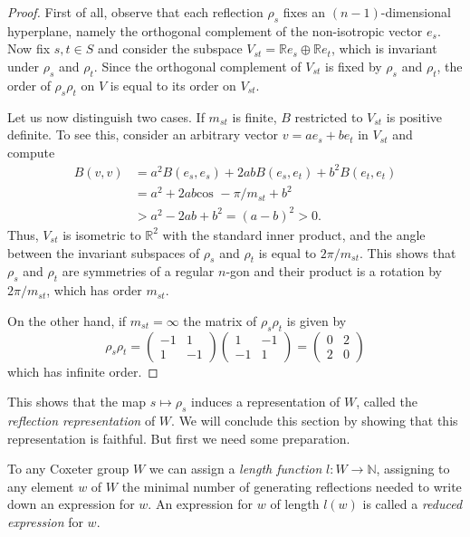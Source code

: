\documentclass{article}
\theoremstyle{definition}
\begin{document}
\begin{proof}
First of all, observe that each reflection $\rho_s$ fixes an $(n-1)$-dimensional hyperplane, namely the orthogonal complement of the non-isotropic vector $e_s$. Now fix $s,t\in S$ and consider the subspace $V_{st} = \mathbb{R}e_s \oplus \mathbb{R}e_t$, which is invariant under $\rho_s$ and $\rho_t$. Since the orthogonal complement of $V_{st}$ is fixed by $\rho_s$ and $\rho_t$, the order of $\rho_s\rho_t$ on $V$ is equal to its order on $V_{st}$.

Let us now distinguish two cases. If $m_{st}$ is finite, $B$ restricted to $V_{st}$ is positive definite. To see this, consider an arbitrary vector $v = ae_s + b e_t$ in $V_{st}$ and compute
\begin{align*}
B(v, v) & = a^2B(e_s, e_s) + 2abB(e_s, e_t) + b^2B(e_t, e_t)\\
& = a^2 + 2ab\text{cos } -\pi / m_{st} + b^2 \\
& > a^2 - 2ab + b^2 = (a - b)^2 > 0.
\end{align*}
Thus, $V_{st}$ is isometric to $\mathbb{R}^2$ with the standard inner product, and the angle between the invariant subspaces of $\rho_s$ and $\rho_t$ is equal to $2 \pi / m_{st}$. This shows that $\rho_s$ and $\rho_t$ are symmetries of a regular $n$-gon and their product is a rotation by $2\pi/m_{st}$, which has order $m_{st}$.

On the other hand, if $m_{st} = \infty$ the matrix of $\rho_s\rho_t$ is given by
$$\rho_s \rho_t = \left( \begin{matrix}
-1 & 1 \\ 1 & -1
\end{matrix} \right)
\left( \begin{matrix}
1 & -1 \\ -1 & 1
\end{matrix} \right)
= \left( \begin{matrix}
0 & 2 \\ 2 & 0
\end{matrix} \right)
$$
which has infinite order.
\end{proof}

This shows that the map $s \mapsto \rho_s$ induces a representation of $W$, called the \textit{reflection representation} of $W$. We will conclude this section by showing that this representation is faithful. But first we need some preparation.

To any Coxeter group $W$ we can assign a \textit{length function} $l: W \rightarrow \mathbb{N}$, assigning to any element $w$ of $W$ the minimal number of generating reflections needed to write down an expression for $w$. An expression for $w$ of length $l(w)$ is called a \textit{reduced expression} for $w$.
\end{document}
